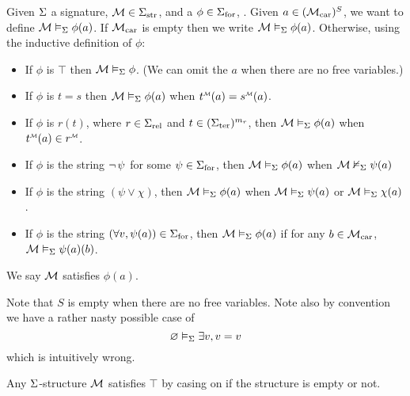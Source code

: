 \begin{dfn}[Satisfaction]
    Given $\Sigma$ a signature, $\mathcal{M} \in {\Sigma}_\mathrm{str}$, 
    and a $\phi \in {\Sigma}_\mathrm{for}$,
    .
    Given $a \in ({\mathcal{M}}_\mathrm{car})^S$, 
    we want to define $\mathcal{M} \vDash_{\Sigma} \phi(a)$.
    If ${\mathcal{M}}_\mathrm{car}$ is empty then we write 
    $\mathcal{M} \vDash_{\Sigma} \phi(a)$.
    Otherwise, using the inductive definition of $\phi$:
    \begin{itemize}
        \item If $\phi$ is $\top$ then $\mathcal{M} \vDash_{\Sigma} \phi$.
            (We can omit the $a$ when there are no free variables.)
        \item If $\phi$ is $t = s$ then
            $\mathcal{M} \vDash_{\Sigma} \phi(a)$ when 
            $\modintp{\MM}{t}(a) = \modintp{\MM}{s}(a)$.
            \item If $\phi$ is $r(t)$, 
            where $r \in {\Sigma}_\mathrm{rel}$ and 
            $t \in ({\Sigma}_\mathrm{ter})^{m_r}$,
            then $\mathcal{M} \vDash_{\Sigma} \phi(a)$ when 
            $\modintp{\MM}{t}(a) \in \modintp{\MM}{r}$.
            \vspace{1em}
        \item If $\phi$ is the string 
            $\neg\,\psi$ for some $\psi \in {\Sigma}_\mathrm{for}$, 
            then $\mathcal{M} \vDash_{\Sigma} \phi(a)$ when $\mathcal{M} \nvDash_{\Sigma} \psi(a)$
        \item If $\phi$ is the string $(\psi \lor \chi)$, 
            then $\mathcal{M} \vDash_{\Sigma} \phi(a)$ when 
            $\mathcal{M} \vDash_{\Sigma} \psi(a)$ or $\mathcal{M} \vDash_{\Sigma} \chi(a)$.
        \item If $\phi$ is the string 
            $(\forall v, \psi(a)) \in {\Sigma}_\mathrm{for}$,
            then $\mathcal{M} \vDash_{\Sigma} \phi(a)$ 
            if for any $b \in {\mathcal{M}}_\mathrm{car}$,   
            $\mathcal{M} \vDash_{\Sigma} \psi(a)(b)$.
    \end{itemize}
    We say $\mathcal{M}$ satisfies $\phi(a)$.
\end{dfn}
\begin{rmk}
    Note that $S$ is empty when there are no free variables.
    Note also by convention we have a rather nasty possible case of 
    \[\varnothing \vDash_{\Sigma} \exists v, v = v\]
    which is intuitively wrong.%
\end{rmk}
\begin{rmk}
    Any $\Sigma$-structure $\mathcal{M}$ satisfies $\top$ by casing on if 
    the structure is empty or not.
\end{rmk}


